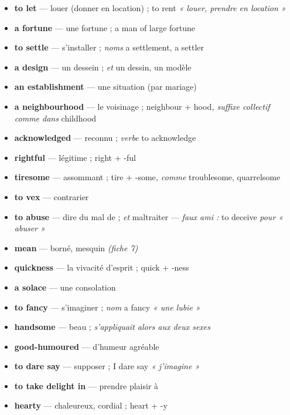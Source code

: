 \documentclass{fiche}
\begin{document}

\begin{itemize}[label=--,itemsep=0.8mm,leftmargin=*]\small
  \item \textbf{to let} — louer (donner en location) ; to rent \textit{« louer, prendre en location »}
  \item \textbf{a fortune} — une fortune ; a man of large fortune
  \item \textbf{to settle} — s'installer ; \textit{noms} a settlement, a settler
  \item \textbf{a design} — un dessein ; \textit{et} un dessin, un modèle
  \item \textbf{an establishment} — une situation (par mariage)
  \item \textbf{a neighbourhood} — le voisinage ; neighbour + hood\textit{, suffixe collectif comme dans} childhood
  \item \textbf{acknowledged} — reconnu ; \textit{verbe} to acknowledge
  \item \textbf{rightful} — légitime ; right + -ful
  \item \textbf{tiresome} — assommant ; tire + -some\textit{, comme} troublesome, quarrelsome
  \item \textbf{to vex} — contrarier
  \item \textbf{to abuse} — dire du mal de ; \textit{et} maltraiter --- \textit{faux ami :} to deceive \textit{pour « abuser »}
  \item \textbf{mean} — borné, mesquin \textit{(fiche 7)}
  \item \textbf{quickness} — la vivacité d'esprit ; quick + -ness
  \item \textbf{a solace} — une consolation
  \item \textbf{to fancy} — s'imaginer ; \textit{nom} a fancy \textit{« une lubie »}
  \item \textbf{handsome} — beau ; \textit{s'appliquait alors aux deux sexes}
  \item \textbf{good-humoured} — d'humeur agréable
  \item \textbf{to dare say} — supposer ; I dare say \textit{« j'imagine »}
  \item \textbf{to take delight in} — prendre plaisir à
  \item \textbf{hearty} — chaleureux, cordial ; heart + -y
\end{itemize}
\end{document}
